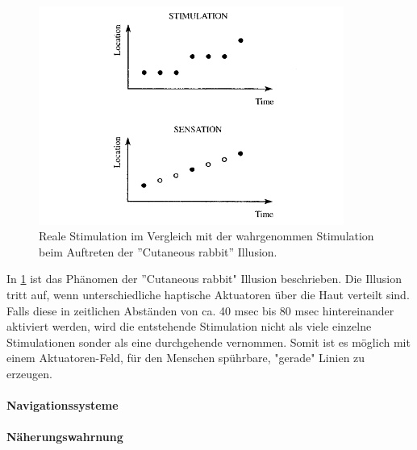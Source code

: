 \documentclass{llncs}					%
\begin{document}
\begin{figure}[htbp]
	\begin{center}
		\includegraphics[width = 10cm]{Grafiken/14-Sensory-Saltation.png}
		\caption{Reale Stimulation im Vergleich mit der wahrgenommen Stimulation beim Auftreten der ''Cutaneous rabbit'' Illusion\cite{Tan:2005:TDS:1198555.1198611}.}
		\label{14-Sensory-Saltation}
	\end{center}
\end{figure}

In \ref{14-Sensory-Saltation} ist das Phänomen der ''Cutaneous rabbit"\cite{geldard1972cutaneous} Illusion beschrieben. Die Illusion tritt auf, wenn unterschiedliche haptische Aktuatoren über die Haut verteilt sind. Falls diese in zeitlichen Abständen von ca. 40 msec bis 80 msec hintereinander aktiviert werden, wird die entstehende Stimulation nicht als viele einzelne Stimulationen sonder als eine durchgehende vernommen. Somit ist es möglich mit einem Aktuatoren-Feld, für den Menschen spührbare, "gerade" Linien zu erzeugen.

\paragraph{Navigationssysteme}

\paragraph{Näherungswahrnung}
\end{document}
